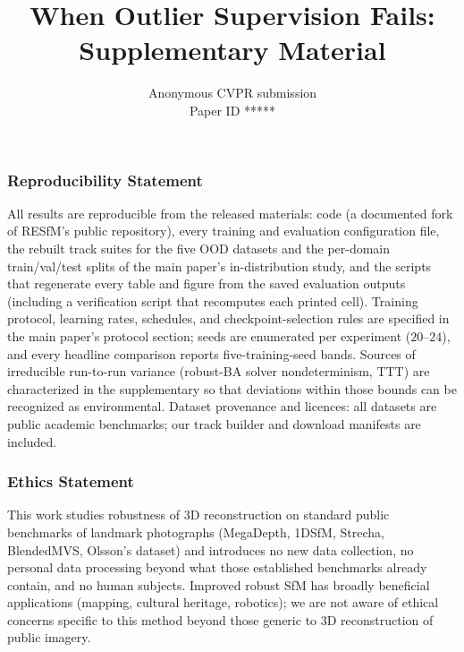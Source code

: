\documentclass[10pt,twocolumn,letterpaper]{article}
\title{When Outlier Supervision Fails: Supplementary Material}
\author{Anonymous CVPR submission\\ Paper ID *****}
\begin{document}
\maketitle
\appendix
\subsubsection*{Reproducibility Statement}
All results are reproducible from the released materials: code (a documented fork of
RESfM's public repository), every training and evaluation configuration file, the
rebuilt track suites for the five OOD datasets and the per-domain train/val/test splits of the main paper's in-distribution study, and the scripts that regenerate every table and figure from the
saved evaluation outputs (including a verification script that recomputes each printed
cell). Training protocol, learning rates, schedules, and checkpoint-selection rules are
specified in the main paper's protocol section; seeds are enumerated per experiment ($20$--$24$),
and every headline comparison reports five-training-seed bands. Sources of
irreducible run-to-run variance (robust-BA solver nondeterminism, TTT) are
characterized in the supplementary so that deviations within those bounds can be
recognized as environmental. Dataset provenance and licences: all datasets are public
academic benchmarks; our track builder and download manifests are included.

\subsubsection*{Ethics Statement}
This work studies robustness of 3D reconstruction on standard public benchmarks of
landmark photographs (MegaDepth, 1DSfM, Strecha, BlendedMVS, Olsson's dataset) and
introduces no new data collection, no personal data processing beyond what those
established benchmarks already contain, and no human subjects. Improved robust SfM has
broadly beneficial applications (mapping, cultural heritage, robotics); we are not
aware of ethical concerns specific to this method beyond those generic to 3D
reconstruction of public imagery.
\end{document}
